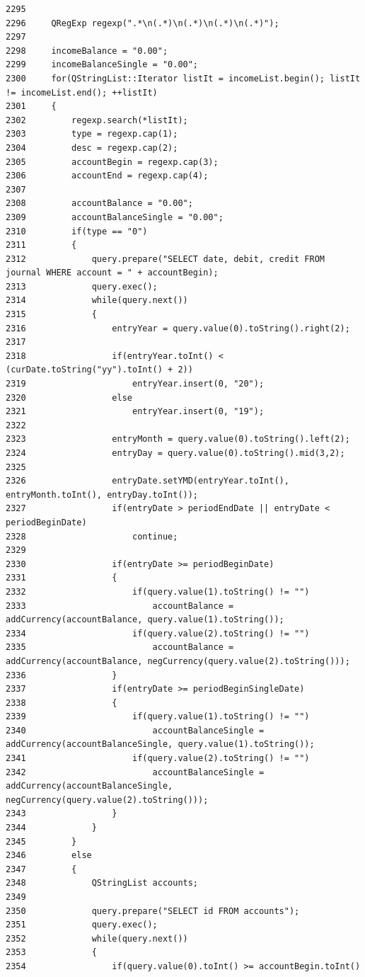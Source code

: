 \begin{verbatim}
2295 
2296     QRegExp regexp(".*\n(.*)\n(.*)\n(.*)\n(.*)");
2297 
2298     incomeBalance = "0.00";
2299     incomeBalanceSingle = "0.00";
2300     for(QStringList::Iterator listIt = incomeList.begin(); listIt != incomeList.end(); ++listIt)
2301     {
2302         regexp.search(*listIt);
2303         type = regexp.cap(1);
2304         desc = regexp.cap(2);
2305         accountBegin = regexp.cap(3);
2306         accountEnd = regexp.cap(4);
2307 
2308         accountBalance = "0.00";
2309         accountBalanceSingle = "0.00";
2310         if(type == "0")
2311         {
2312             query.prepare("SELECT date, debit, credit FROM journal WHERE account = " + accountBegin);
2313             query.exec();
2314             while(query.next())
2315             {
2316                 entryYear = query.value(0).toString().right(2);
2317 
2318                 if(entryYear.toInt() < (curDate.toString("yy").toInt() + 2))
2319                     entryYear.insert(0, "20");
2320                 else
2321                     entryYear.insert(0, "19");
2322 
2323                 entryMonth = query.value(0).toString().left(2);
2324                 entryDay = query.value(0).toString().mid(3,2);
2325 
2326                 entryDate.setYMD(entryYear.toInt(), entryMonth.toInt(), entryDay.toInt());
2327                 if(entryDate > periodEndDate || entryDate < periodBeginDate)
2328                     continue;
2329 
2330                 if(entryDate >= periodBeginDate)
2331                 {
2332                     if(query.value(1).toString() != "")
2333                         accountBalance = addCurrency(accountBalance, query.value(1).toString());
2334                     if(query.value(2).toString() != "")
2335                         accountBalance = addCurrency(accountBalance, negCurrency(query.value(2).toString()));
2336                 }
2337                 if(entryDate >= periodBeginSingleDate)
2338                 {
2339                     if(query.value(1).toString() != "")
2340                         accountBalanceSingle = addCurrency(accountBalanceSingle, query.value(1).toString());
2341                     if(query.value(2).toString() != "")
2342                         accountBalanceSingle = addCurrency(accountBalanceSingle, negCurrency(query.value(2).toString()));
2343                 }
2344             }
2345         }
2346         else
2347         {
2348             QStringList accounts;
2349 
2350             query.prepare("SELECT id FROM accounts");
2351             query.exec();
2352             while(query.next())
2353             {
2354                 if(query.value(0).toInt() >= accountBegin.toInt()

\end{verbatim}
